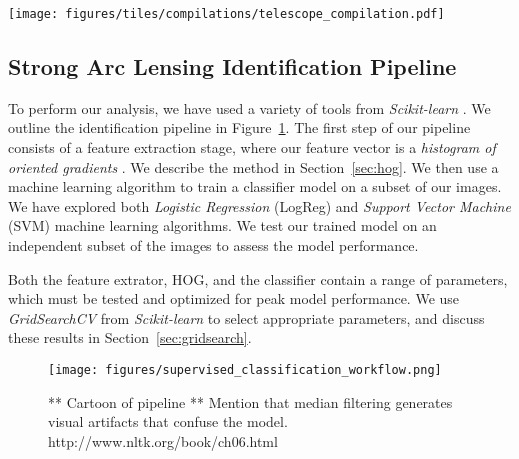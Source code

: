 \documentclass{emulateapj}
\begin{document}
\begin{figure*}[t]\label{fig:mockimages}
\begin{center}
\texttt{[image: figures/tiles/compilations/telescope\_compilation.pdf]}
\caption{Left to right show example mock HST, LSST 10 year, and LSST 1
  year images.  The top row corresponds to a lensing system with a
  very visible arc signature, and the bottom row to a lensing system
  that is less obvious.  Example mock HST images have
  $n_\text{pix}\times n_\text{pix}=300\times300$.  Example mock LSST
  images have $n_\text{pix}\times n_\text{pix}=45\times45$.  The
  resolution and noise of a ground based telescope is noticeably
  worse. Visual identification of giant arcs in the LSST images in the
  bottom row is very difficult.}
\end{center}
\end{figure*}

\subsection{Strong Arc Lensing Identification Pipeline}

To perform our analysis, we have used a variety of tools from {\em
  Scikit-learn} \citep{pedregosa_etal12}.  We outline the
identification pipeline in Figure~\ref{fig:pipeline}.  The first step
of our pipeline consists of a feature extraction stage, where our
feature vector is a {\em histogram of oriented gradients}
\citep{dalalandtriggs_05}.  We describe the method in
Section~\ref{sec:hog}.  We then use a machine learning algorithm to
train a classifier model on a subset of our images.  We have explored
both {\em Logistic Regression} (LogReg) and {\em Support Vector Machine}
(SVM) machine learning algorithms.  We test our trained model on an
independent subset of the images to assess the model performance.

Both the feature extrator, HOG, and the classifier contain a range of
parameters, which must be tested and optimized for peak model
performance.  We use {\em GridSearchCV} from {\em Scikit-learn} to
select appropriate parameters, and discuss these results in
Section~\ref{sec:gridsearch}.

\begin{figure}[t]\label{fig:pipeline}
\begin{center}
\texttt{[image: figures/supervised\_classification\_workflow.png]}
\caption{** Cartoon of pipeline ** Mention that median filtering generates
visual artifacts that confuse the model. http://www.nltk.org/book/ch06.html}
\end{center}
\end{figure}
\end{document}
